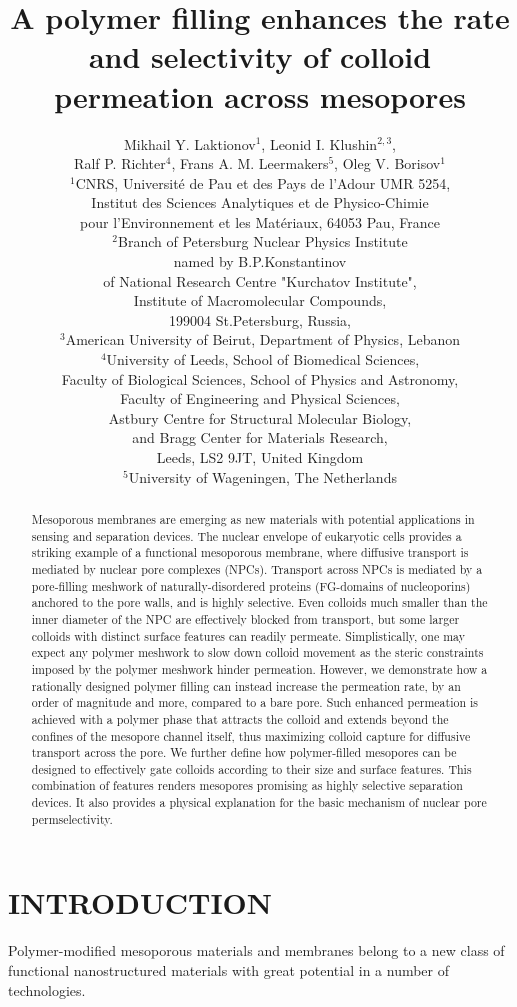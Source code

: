 \documentclass[12pt, a4paper]{article}
\title{A polymer filling enhances the rate and selectivity of colloid permeation across mesopores}
\author{Mikhail Y. Laktionov$^1$, Leonid I. Klushin$^{2,3}$,\\
Ralf P. Richter$^4$, Frans A. M. Leermakers$^5$, Oleg V. Borisov$^1$\\
$^{1}$CNRS, Universit\'e de Pau et des Pays de l'Adour UMR 5254,\\
Institut des Sciences Analytiques et de Physico-Chimie\\
pour l'Environnement et les Mat\'eriaux, 64053 Pau, France\\
$^{2}$Branch of Petersburg Nuclear Physics Institute\\
named by B.P.Konstantinov\\
of National Research Centre "Kurchatov Institute",\\
Institute of Macromolecular Compounds,\\
199004 St.Petersburg, Russia,\\
$^{3}$American University of Beirut, Department of Physics, Lebanon\\
$^{4}$University of Leeds, School of Biomedical Sciences,\\
Faculty of Biological Sciences, 
School of Physics and Astronomy,\\
Faculty of Engineering and Physical Sciences,\\  
Astbury Centre for Structural Molecular Biology,\\ 
and Bragg Center for Materials Research,\\ 
Leeds, LS2 9JT, United Kingdom\\
$^{5}$University of Wageningen, The Netherlands\\
}
\date{}
\begin{document}
\maketitle

\begin{abstract}

Mesoporous membranes are emerging as new materials with potential applications in sensing and separation devices.
The nuclear envelope of eukaryotic cells provides a striking example of a functional mesoporous membrane, where diffusive transport is mediated by nuclear pore complexes (NPCs).
Transport across NPCs is mediated by a pore-filling meshwork of naturally-disordered proteins (FG-domains of nucleoporins) anchored to the pore walls, and is highly selective.
Even colloids much smaller than the inner diameter of the NPC are effectively blocked from transport, but some larger colloids with distinct surface features can readily permeate.
Simplistically, one may expect any polymer meshwork to slow down colloid movement as the steric constraints imposed by the polymer meshwork hinder permeation.
However, we demonstrate how a rationally designed polymer filling can instead increase the permeation rate, by an order of magnitude and more, compared to a bare pore.
Such enhanced permeation is achieved with a polymer phase that attracts the colloid and extends beyond the confines of the mesopore channel itself, thus maximizing colloid capture for diffusive transport across the pore.
We further define how polymer-filled mesopores can be designed to effectively gate colloids according to their size and surface features. 
This combination of features renders mesopores promising as highly selective separation devices.
It also provides a physical explanation for the basic mechanism of nuclear pore permselectivity.
\end{abstract}


\section{INTRODUCTION}

Polymer-modified mesoporous materials and membranes belong to a new class of functional nanostructured materials with great potential in a number of technologies. 
\end{document}
